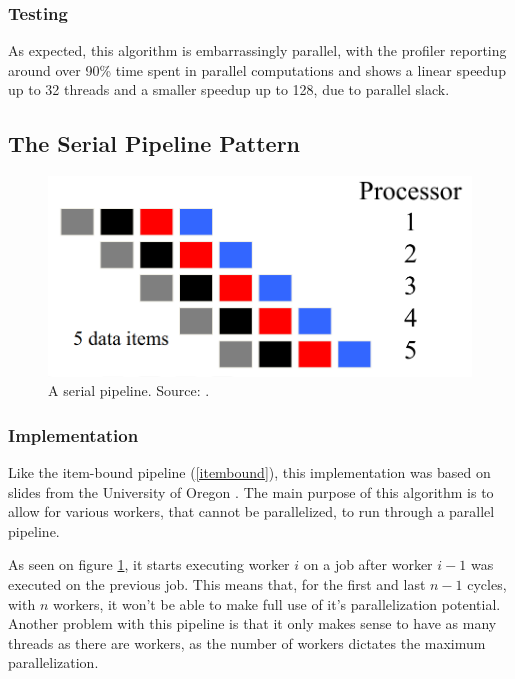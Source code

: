 \documentclass[10pt,journal]{IEEEtran}
\begin{document}
\subsubsection{Testing}

As expected, this algorithm is embarrassingly parallel, with the profiler reporting around over 90\% time spent in parallel computations and shows a linear speedup up to 32 threads and a smaller speedup up to 128, due to parallel slack.

\subsection{The Serial Pipeline Pattern}

\begin{figure}[htbp]
	\centerline{\includegraphics[scale=0.12]{img/serialpipeline.png}}
	\caption{ A serial pipeline. Source: \cite{pipelineoregon}.  }
	\label{serialpipe}
\end{figure}

\subsubsection{Implementation}

Like the item-bound pipeline (\ref{itembound}), this implementation was based on slides from the University of Oregon \cite{pipelineoregon}. The main purpose of this algorithm is to allow for various workers, that cannot be parallelized, to run through a parallel pipeline. 

As seen on figure \ref{serialpipe}, it starts executing worker $ i $ on a job after worker $ i - 1 $ was executed on the previous job. This means that, for the first and last $ n - 1 $ cycles, with $ n $ workers, it won't be able to make full use of it's parallelization potential. Another problem with this pipeline is that it only makes sense to have as many threads as there are workers, as the number of workers dictates the maximum parallelization.
\end{document}

